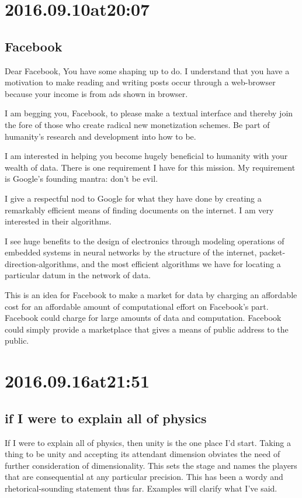 \begin{enumerate}
\begin{enumerate}
\section*{ 2016.09.10at20:07 }
\subsection*{ Facebook }
Dear Facebook,
You have some shaping up to do. I understand that you have a motivation to make reading and writing posts occur through a web-browser because your income is from ads shown in browser.

I am begging you, Facebook, to please make a textual interface and thereby join the fore of those who create radical new monetization schemes. Be part of humanity's research and development into how to be.

I am interested in helping you become hugely beneficial to humanity with your wealth of data. There is one requirement I have for this mission. My requirement is Google's founding mantra: don't be evil.

I give a respectful nod to Google for what they have done by creating a remarkably efficient means of finding documents on the internet. I am very interested in their algorithms.

I see huge benefits to the design of electronics through modeling operations of embedded systems in neural networks by the structure of the internet, packet-direction-algorithms, and the most efficient algorithms we have for locating a particular datum in the network of data.

This is an idea for Facebook to make a market for data by charging an affordable cost for an affordable amount of computational effort on Facebook's part. Facebook could charge for large amounts of data and computation. Facebook could simply provide a marketplace that gives a means of public address to the public.


\section*{ 2016.09.16at21:51 }
\subsection*{ if I were to explain all of physics }
If I were to explain all of physics, then unity is the one place I'd start. Taking a thing to be unity and accepting its attendant dimension obviates the need of further consideration of dimensionality. This sets the stage and names the players that are consequential at any particular precision. This has been a wordy and rhetorical-sounding statement thus far. Examples will clarify what I've said.


\end{enumerate}
\end{enumerate}
